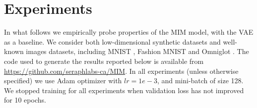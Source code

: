 \section{Experiments} \label{sec:experiments}

In what follows we empirically probe properties of the MIM model,
with the VAE as a baseline.  We consider both low-dimensional synthetic 
datasets and well-known images datasets, including MNIST \cite{LeCun1998}, 
Fashion MNIST \cite{DBLP:journals/corr/abs-1708-07747} and Omniglot \cite{Lake2015}. 
The code used to generate the results reported below is available 
from \href{https://github.com/seraphlabs-ca/MIM}{https://github.com/seraphlabs-ca/MIM}.
In all experiments (unless otherwise specified) we use Adam optimizer \cite{2014arXiv1412.6980K} with $lr = 1e-3$, and
mini-batch of size 128. We stopped training for all experiments when validation loss
has not improved for 10 epochs.
